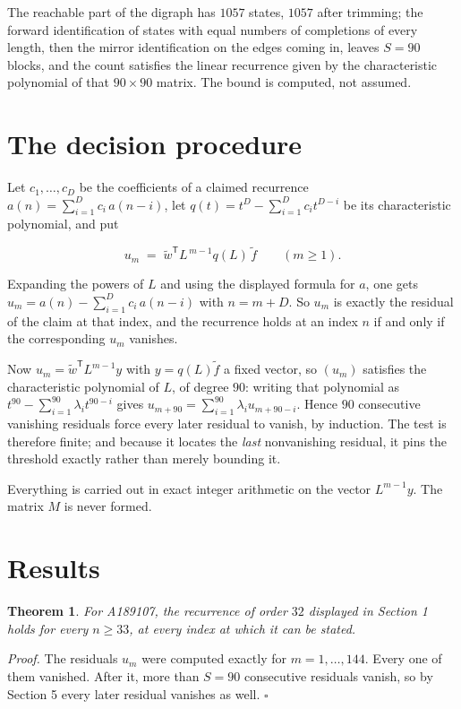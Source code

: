 \documentclass[11pt]{article}
\newtheorem{theorem}{Theorem}
\theoremstyle{definition}
\begin{document}
The reachable part of the digraph has $1057$ states, $1057$ after trimming; the forward identification of states with equal numbers of completions of every length, then the mirror identification on the edges coming in, leaves $S = 90$ blocks, and the count satisfies the linear recurrence given by the characteristic polynomial of that $90\times90$ matrix. The bound is computed, not assumed.

\section{The decision procedure}

Let $c_1,\dots,c_D$ be the coefficients of a claimed recurrence $a(n) = \sum_{i=1}^{D} c_i\,a(n-i)$, let $q(t) = t^{D} - \sum_{i=1}^{D} c_i t^{D-i}$ be its characteristic polynomial, and put

\[u_m \;=\; \tilde w^{\mathsf T} L^{\,m-1} q(L)\,\tilde f \qquad (m \ge 1).\]

Expanding the powers of $L$ and using the displayed formula for $a$, one gets $u_m = a(n) - \sum_{i=1}^{D} c_i\,a(n-i)$ with $n = m + D$. So $u_m$ is exactly the residual of the claim at that index, and the recurrence holds at an index $n$ if and only if the corresponding $u_m$ vanishes.

Now $u_m = \tilde w^{\mathsf T} L^{m-1} y$ with $y = q(L)\tilde f$ a fixed vector, so $(u_m)$ satisfies the characteristic polynomial of $L$, of degree $90$: writing that polynomial as $t^{90} - \sum_{i=1}^{90} \lambda_i t^{90-i}$ gives $u_{m+90} = \sum_{i=1}^{90} \lambda_i u_{m+90-i}$. Hence $90$ consecutive vanishing residuals force every later residual to vanish, by induction. The test is therefore finite; and because it locates the {\itshape last} nonvanishing residual, it pins the threshold exactly rather than merely bounding it.

Everything is carried out in exact integer arithmetic on the vector $L^{m-1}y$. The matrix $M$ is never formed.

\section{Results}

\begin{theorem} For A189107, the recurrence of order $32$ displayed in Section 1 holds for every $n \ge 33$, at every index at which it can be stated.\end{theorem}

{\itshape Proof.} The residuals $u_m$ were computed exactly for $m = 1,\dots,144$. Every one of them vanished. After it, more than $S = 90$ consecutive residuals vanish, so by Section 5 every later residual vanishes as well. $\square$
\end{document}
